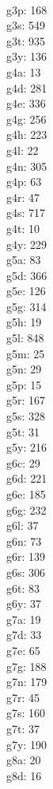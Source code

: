 \begin{multicols}{8}
  \\g3p: 168
  \\g3s: 549
  \\g3t: 935
  \\g3y: 136
  \\g4a: 13
  \\g4d: 281
  \\g4e: 336
  \\g4g: 256
  \\g4h: 223
  \\g4l: 22
  \\g4n: 305
  \\g4p: 63
  \\g4r: 47
  \\g4s: 717
  \\g4t: 10
  \\g4y: 229
  \\g5a: 83
  \\g5d: 366
  \\g5e: 126
  \\g5g: 314
  \\g5h: 19
  \\g5l: 848
  \\g5m: 25
  \\g5n: 29
  \\g5p: 15
  \\g5r: 167
  \\g5s: 328
  \\g5t: 31
  \\g5y: 216
  \\g6c: 29
  \\g6d: 221
  \\g6e: 185
  \\g6g: 232
  \\g6l: 37
  \\g6n: 73
  \\g6r: 139
  \\g6s: 306
  \\g6t: 83
  \\g6y: 37
  \\g7a: 19
  \\g7d: 33
  \\g7e: 65
  \\g7g: 188
  \\g7n: 179
  \\g7r: 45
  \\g7s: 160
  \\g7t: 37
  \\g7y: 190
  \\g8a: 20
  \\g8d: 16

\end{multicols}
